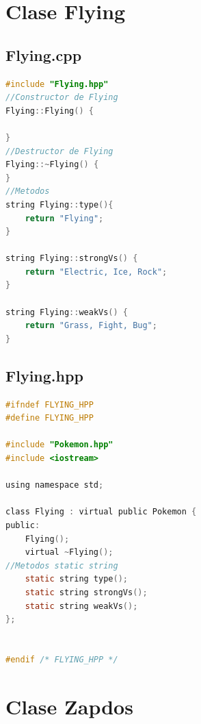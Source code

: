 \documentclass[11pt]{article}
\begin{document}
\section{Clase Flying}
\subsection{Flying.cpp}
\begin{lstlisting}[language=C]
#include "Flying.hpp"
//Constructor de Flying
Flying::Flying() {
   
}
//Destructor de Flying
Flying::~Flying() {
}
//Metodos
string Flying::type(){
    return "Flying";
}

string Flying::strongVs() {
    return "Electric, Ice, Rock";
}

string Flying::weakVs() {
    return "Grass, Fight, Bug";
}


\end{lstlisting}



\subsection{Flying.hpp}
\begin{lstlisting}[language=C]
#ifndef FLYING_HPP
#define FLYING_HPP

#include "Pokemon.hpp"
#include <iostream>

using namespace std;

class Flying : virtual public Pokemon {
public:
    Flying();
    virtual ~Flying();
//Metodos static string
    static string type();
    static string strongVs();
    static string weakVs();
};


#endif /* FLYING_HPP */

\end{lstlisting}

\section{Clase Zapdos}
\end{document}
